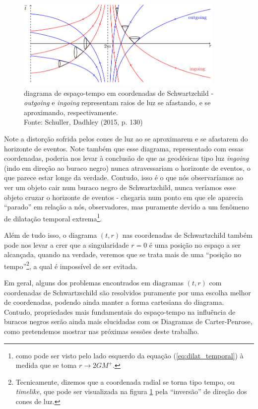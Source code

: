 \documentclass[12pt, a4paper]{article}
\theoremstyle{meuremarkstyle}
\theoremstyle{definicao}
\begin{document}
\begin{figure}[h!]
  \centering
  \includegraphics[width=0.9\textwidth]{Figuras/diag_schwc.png}
  \caption{diagrama de espaço-tempo em coordenadas de Schwartzchild - \textit{outgoing} e
          \textit{ingoing} representam raios de luz se afastando, e se aproximando, respectivamente. \\Fonte: Schuller, Dadhley (2015, p. 130)\cite{schuller2015}}
  \label{fig:diag_schwc}
\end{figure}

Note a distorção sofrida pelos cones de luz ao se aproximarem e se afastarem do horizonte de eventos. Note também que
esse diagrama, representado com essas coordenadas, poderia nos levar à conclusão de que as geodésicas tipo luz \textit{ingoing} (indo em direção ao buraco negro)
nunca atravessariam o horizonte de eventos, o que parece estar longe da verdade. Contudo, isso é o que nós observaríamos ao ver um objeto cair num
buraco negro de Schwartzchild, nunca veríamos esse objeto cruzar o horizonte de eventos - chegaria num ponto em que
ele aparecia \enquote{parado} em relação a nós, observadores, mas puramente devido a um fenômeno de dilatação
temporal extrema\footnote{como pode ser visto pelo lado esquerdo da equação (\ref{eq:dilat_temporal}) à medida que se toma $r \to 2GM^{+}$.}.  

Além de tudo isso, o diagrama $(t,r)$ nas coordenadas de Schwartzchild também pode nos levar a crer que a singularidade
$r=0$ é uma posição no espaço a ser alcançada, quando na verdade, veremos que se trata mais de uma \enquote{posição no tempo}\footnote{Tecnicamente, dizemos que a coordenada radial se torna tipo tempo, ou \textit{timelike}, que pode ser visualizada na figura \ref{fig:diag_schwc} pela \enquote{inversão} de direção dos cones de luz.},
a qual é impossível de ser evitada.

Em geral, alguns dos problemas encontrados em diagramas $(t,r)$ com coordenadas de Schwartzschild são resolvidos puramente por uma
escolha melhor de coordenadas, podendo ainda manter a forma cartesiana do diagrama. Contudo, propriedades mais fundamentais do espaço-tempo
na influência de buracos negros serão ainda mais elucidadas com os Diagramas de Carter-Penrose, como pretendemos mostrar nas próximas sessões deste trabalho.
\end{document}
